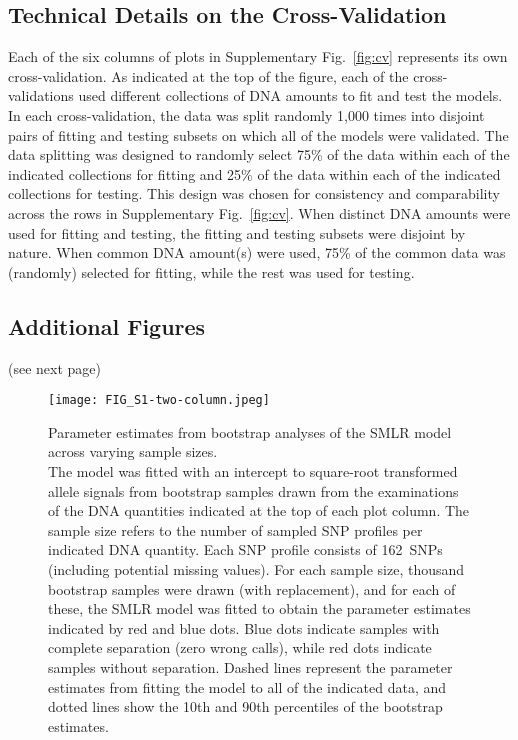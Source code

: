 \documentclass[preprint,5p,times,11pt]{elsarticle}
\begin{document}
\newpage
\subsection*{Technical Details on the Cross-Validation}
Each of the six columns of plots in Supplementary Fig.~\ref{fig:cv} represents its own cross-validation.
As indicated at the top of the figure, each of the cross-validations used different collections of DNA amounts to fit and test the models.
In each cross-validation, the data was split randomly 1,000 times into disjoint pairs of fitting and testing subsets on which all of the models were validated.
The data splitting was designed to randomly select 75\% of the data within each of the indicated collections for fitting and 25\% of the data within each of the indicated collections for testing.
This design was chosen for consistency and comparability across the rows in Supplementary Fig.~\ref{fig:cv}.
When distinct DNA amounts were used for fitting and testing, the fitting and testing subsets were disjoint by nature.
When common DNA amount(s) were used, 75\% of the common data was (randomly) selected for fitting, while the rest was used for testing.


\vspace{2cm}
\subsection*{Additional Figures}
\noindent (see next page)


\begin{landscape}
\begin{figure*}
\centering
\texttt{[image: FIG\_S1-two-column.jpeg]}
\caption{
Parameter estimates from bootstrap analyses of the SMLR model across varying sample sizes.\\
The model was fitted with an intercept to square-root transformed allele signals from bootstrap samples drawn from the examinations of the DNA quantities indicated at the top of each plot column.
The sample size refers to the number of sampled SNP profiles per indicated DNA quantity.
Each SNP profile consists of 162~SNPs (including potential missing values).
For each sample size, thousand bootstrap samples were drawn (with replacement), and for each of these, the SMLR model was fitted to obtain the parameter estimates indicated by red and blue dots.
Blue dots indicate samples with complete separation (zero wrong calls), while red dots indicate samples without separation.
Dashed lines represent the parameter estimates from fitting the model to all of the indicated data, and dotted lines show the 10th and 90th percentiles of the bootstrap estimates.
}
\label{fig:bootstrap}
\end{figure*}
\end{landscape}
\end{document}
